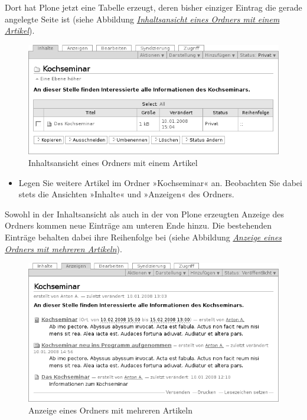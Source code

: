 \documentclass[a4paper,12pt,ngerman]{manual}
\begin{document}
Dort hat Plone jetzt eine Tabelle erzeugt, deren bisher einziger Eintrag die
gerade angelegte Seite ist (siehe Abbildung \hyperlink{fig-folder-with-object}{\emph{Inhaltsansicht eines Ordners mit einem Artikel}}).
\hypertarget{fig-folder-with-object}{}\begin{figure}[htbp]
\centering

\includegraphics{folder-with-object.png}
\caption{Inhaltsansicht eines Ordners mit einem Artikel}\end{figure}
\begin{itemize}
\item {} 
Legen Sie weitere Artikel im Ordner »Kochseminar« an. Beobachten Sie
dabei stets die Ansichten »Inhalte« und »Anzeigen« des Ordners.

\end{itemize}

Sowohl in der Inhaltsansicht als auch in der von Plone erzeugten Anzeige des
Ordners kommen neue Einträge am unteren Ende hinzu. Die bestehenden Einträge
behalten dabei ihre Reihenfolge bei (siehe
Abbildung \hyperlink{fig-folder-order}{\emph{Anzeige eines Ordners mit mehreren Artikeln}}).
\hypertarget{fig-folder-order}{}\begin{figure}[htbp]
\centering

\includegraphics{folder-order.png}
\caption{Anzeige eines Ordners mit mehreren Artikeln}\end{figure}
\end{document}
